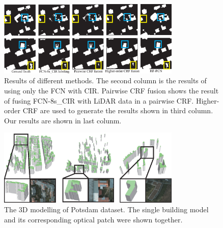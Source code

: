 \begin{figure}
\centering
\includegraphics[width=8.7cm]{Figures/Potsdam_compared_results.eps}
\caption{Results of different methods. The second column is the results of using only the FCN with CIR. Pairwise CRF fusion shows the result of fusing FCN-8s\_CIR with LiDAR data in a pairwise CRF. Higher-order CRF are used to generate the results shown in third column. Our results are shown in last colunm.}
\label{18}
\end{figure}

\begin{figure}
\centering
\includegraphics[width=8.7cm]{Figures/potsdam_models.eps}
\caption{The 3D modelling of Potsdam dataset. The single building model and its corresponding optical patch were shown together.}
\label{19}
\end{figure}
